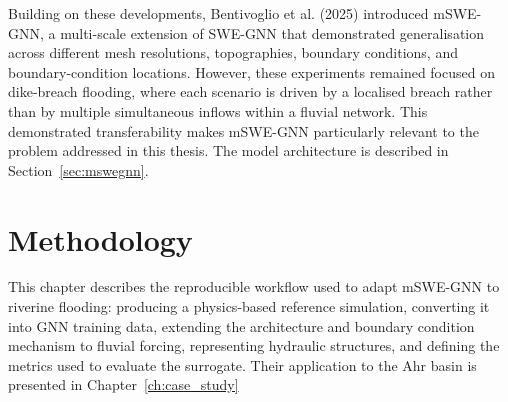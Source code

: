 \documentclass[12pt,a4paper]{report}
\begin{document}
Building on these developments, Bentivoglio et al. (2025) introduced mSWE-GNN, a multi-scale extension of SWE-GNN that demonstrated generalisation across different mesh resolutions, topographies, boundary conditions, and boundary-condition locations. However, these experiments remained focused on dike-breach flooding, where each scenario is driven by a localised breach rather than by multiple simultaneous inflows within a fluvial network. This demonstrated transferability makes mSWE-GNN particularly relevant to the problem addressed in this thesis. The model architecture is described in Section~\ref{sec:mswegnn}.

 

 
\chapter{Methodology}
\label{ch:methodology}
 
This chapter describes the reproducible workflow used to adapt mSWE-GNN to riverine
flooding: producing a physics-based reference simulation, converting it into GNN
training data, extending the architecture and boundary condition mechanism to fluvial
forcing, representing hydraulic structures, and defining the metrics used to evaluate
the surrogate.
Their application to the
Ahr basin is presented in Chapter~\ref{ch:case_study}
 
\end{document}
